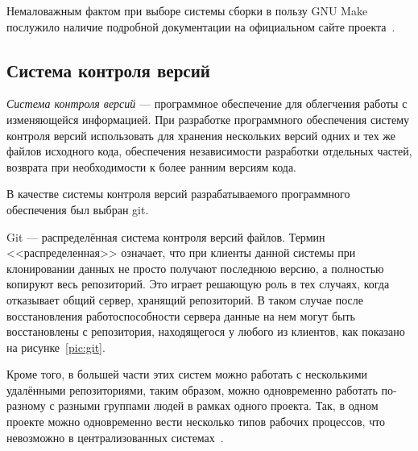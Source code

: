Немаловажным фактом при выборе системы сборки в пользу GNU Make 
послужило наличие подробной документации на официальном сайте 
проекта~\cite{doc_make}.

\subsection{Система контроля версий}

\textit{Система контроля версий} --- программное обеспечение для облегчения
работы с изменяющейся информацией.
При разработке программного обеспечения систему контроля версий использовать
для хранения нескольких версий одних и тех же файлов исходного кода,
обеспечения независимости разработки отдельных частей,
возврата при необходимости к более ранним версиям кода.

В качестве системы контроля версий разрабатываемого программного обеспечения
был выбран git.

Git --- распределённая система контроля версий файлов.
Термин <<распределенная>> означает, что при клиенты данной системы при
клонировании данных не просто получают последнюю версию,
а полностью копируют весь репозиторий.
Это играет решающую роль в тех случаях, когда отказывает 
общий сервер, хранящий репозиторий. 
В таком случае после восстановления работоспособности сервера данные
на нем могут быть восстановлены с репозитория,
находящегося у любого из клиентов, как показано на рисунке~\ref{pic:git}.

Кроме того, в большей части этих систем можно работать с несколькими
удалёнными репозиториями, таким образом, можно одновременно работать по-разному
с разными группами людей в рамках одного проекта.
Так, в одном проекте можно одновременно вести несколько типов рабочих процессов,
что невозможно в централизованных системах~\cite{doc_scm}.

